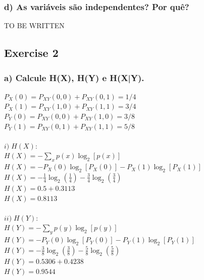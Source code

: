 \documentclass[a4paper]{article}
\begin{document}
\subsubsection{d) As variáveis são independentes? Por quê?}
TO BE WRITTEN

\subsection{Exercise 2}

\subsubsection{a) Calcule H(X), H(Y) e H(X|Y).}

$ P_X(0) = P_{XY}(0,0) + P_{XY}(0,1) = 1/4     $
$ P_X(1) = P_{XY}(1,0) + P_{XY}(1,1) = 3/4     $
$ P_Y(0) = P_{XY}(0,0) + P_{XY}(1,0) = 3/8     $
$ P_Y(1) = P_{XY}(0,1) + P_{XY}(1,1) = 5/8     $

\paragraph{$ i) \; H(X):                                    $
\\
$ \displaystyle H(X) = -\sum_{x} p(x) \log_2 [p(x)]         $\\
$ H(X) = -P_X(0) \log_2 [P_X(0)] -P_X(1) \log_2 [P_X(1)]    $\\
$ \displaystyle 
    H(X) = - \frac{1}{4} \log_2 \left( \frac{1}{4} \right) 
           - \frac{3}{4} \log_2 \left( \frac{3}{4} \right)  $\\
$ H(X) = 0.5 + 0.3113                                       $\\
$ \boxed{ H(X) = 0.8113 }                                   $\\
}
\paragraph{$ ii) \; H(Y):                                   $
\\
$ \displaystyle H(Y) = -\sum_{y} p(y) \log_2 [p(y)]         $\\
$ H(Y) = -P_Y(0) \log_2 [P_Y(0)] -P_Y(1) \log_2 [P_Y(1)]    $\\
$ \displaystyle 
    H(Y) = - \frac{3}{8} \log_2 \left( \frac{3}{8} \right) 
           - \frac{5}{8} \log_2 \left( \frac{5}{8} \right)  $\\
$ H(Y) = 0.5306 + 0.4238                                    $\\
$ \boxed{ H(Y) = 0.9544 }                                   $\\
}
\end{document}
